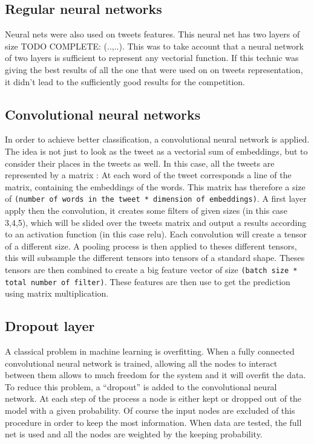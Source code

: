 \subsection{Regular neural networks}

Neural nets were also used on tweets features. This neural net has two layers of size TODO COMPLETE: (..,..). This was to take account that a neural network of  two layers is sufficient to represent any vectorial function.  If this technic was giving the best results of all the one that were used on on tweets representation, it didn't lead to the sufficiently good results for the competition. 

\subsection{Convolutional neural networks}

In order to achieve better classification, a convolutional neural network is applied. The idea is not just to look as the tweet as a vectorial sum of embeddings, but to consider their places in the tweets as well. In this case, all the tweets are represented by a matrix :  At each word of the tweet corresponds a line of the matrix, containing the embeddings of the words. This matrix has therefore a size of \texttt{(number of words in the tweet * dimension of embeddings)}. A first layer apply then the convolution, it creates some filters of given sizes (in this case  3,4,5), which will be slided over the tweets matrix and output a results according to an activation function (in this case relu). Each convolution will create a tensor of a different size. A pooling process is then applied to theses different tensors, this will subsample the different tensors into tensors of a standard shape. Theses tensors are then combined to create a big feature vector of size \texttt{(batch size * total number of filter)}. These features are then use to get the prediction using matrix multiplication. 

\subsection{Dropout layer}
A classical problem in machine learning is overfitting. When a fully connected convolutional neural network is trained, allowing all the nodes to interact between them allows to much freedom for the system and it will overfit the data. To reduce this problem, a ``dropout'' is added to the convolutional neural network. At each step of the process a node is either kept or dropped out of the model with a given probability.  Of course the input nodes are excluded of this procedure in order to keep the most information. When data are tested, the full net is used and all the nodes are weighted by the keeping probability. 

